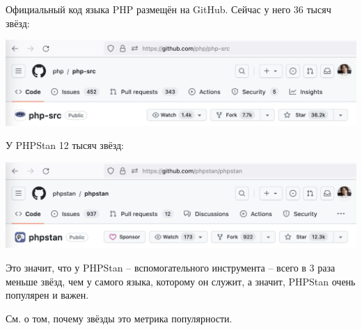 
Официальный код языка PHP размещён на GitHub.
Сейчас у него 36 тысяч звёзд:

\includegraphics[width=\textwidth]{php}

У PHPStan 12 тысяч звёзд:

\includegraphics[width=\textwidth]{phpstan}

Это значит, что у PHPStan -- вспомогательного инструмента -- всего в 3 раза меньше звёзд,
чем у самого языка, которому он служит, а значит, PHPStan очень популярен и важен.

См.  о том, почему звёзды это метрика популярности.

\pagebreak
